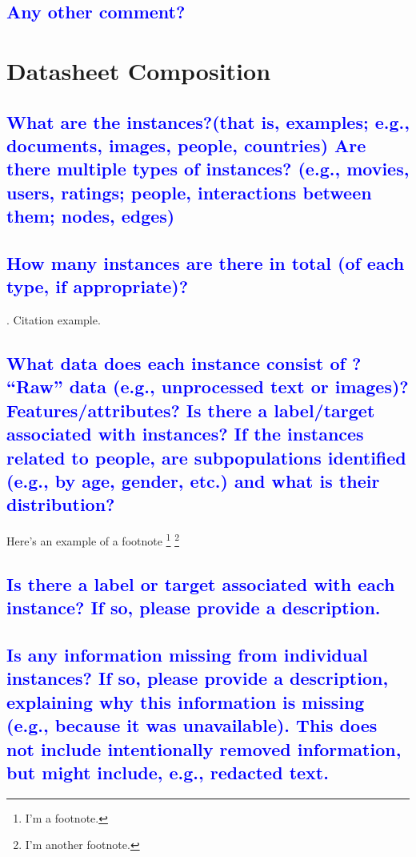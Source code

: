 \documentclass[letterpaper, 10 pt, conference]{ieeeconf}  %
\begin{document}
\lipsum[1]

\textcolor{blue}{\subsection{Any other comment?}}

\lipsum[1]

\section{Datasheet Composition}

\textcolor{blue}{\subsection{What are the instances?(that is, examples; e.g., documents, images, people, countries) Are there multiple types
of instances? (e.g., movies, users, ratings; people, interactions between them; nodes, edges)}}
\lipsum[1]

\textcolor{blue}{\subsection{How many instances are there in total (of each type, if appropriate)?}}
\lipsum[1]. Citation example. \cite{latex:companion, latex2e}

\textcolor{blue}{\subsection{What data does each instance consist of ? “Raw”
data (e.g., unprocessed text or images)? Features/attributes? Is there a label/target associated with
instances? If the instances related to people, are subpopulations identified (e.g., by age, gender, etc.) and what is
their distribution?}}
\lipsum[1]
Here's an example of a footnote \footnote{I'm a footnote.} \footnote{I'm another footnote.}

\textcolor{blue}{\subsection{Is there a label or target associated with each instance? If so, please
provide a description.}}
\lipsum[1]

\textcolor{blue}{\subsection{Is any information missing from individual instances? If so, please
provide a description, explaining why this information is missing (e.g., because it was unavailable). This does not include intentionally removed
information, but might include, e.g., redacted text.}}
\lipsum[1]
\end{document}
